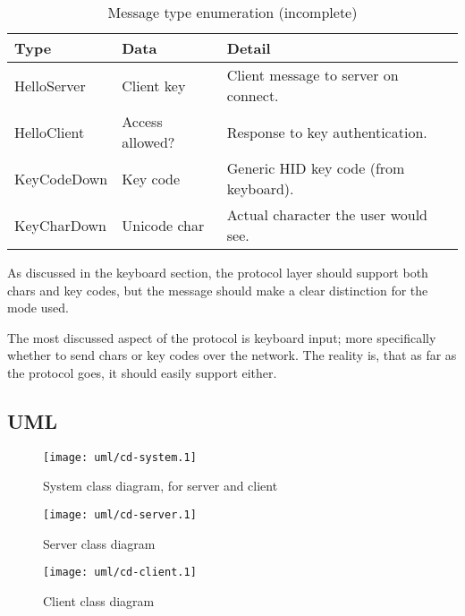 \begin{table}
  \begin{tabular}{|l|l|l|}
    \hline
    \textbf{Type} &
    \textbf{Data} &
    \textbf{Detail} \\
    \hline
    HelloServer & Client key & Client message to server on connect. \\
    HelloClient & Access allowed? & Response to key authentication. \\
    KeyCodeDown & Key code & Generic HID key code (from keyboard). \\
    KeyCharDown & Unicode char & Actual character the user would see. \\
    \hline
  \end{tabular}
  \caption{Message type enumeration (incomplete)}
  \label{tab:messageTypes}
\end{table}

As discussed in the keyboard section, the protocol layer should support both
chars and key codes, but the message should make a clear distinction for the
mode used.

The most discussed aspect of the protocol is keyboard input; more specifically
whether to send chars or key codes over the network. The reality is, that as far
as the protocol goes, it should easily support either.

\clearpage
\subsection{UML}

\begin{figure}[ht!]
  \begin{center}
    \texttt{[image: uml/cd-system.1]}
    \caption{System class diagram, for server and client}
    \label{fig:systemClassDiagram}
  \end{center}
\end{figure}

\begin{figure}[ht!]
  \begin{center}
    \texttt{[image: uml/cd-server.1]}
    \caption{Server class diagram}
    \label{fig:serverClassDiagram}
  \end{center}
\end{figure}

\begin{figure}[ht!]
  \begin{center}
    \texttt{[image: uml/cd-client.1]}
    \caption{Client class diagram}
    \label{fig:clientClassDiagram}
  \end{center}
\end{figure}

